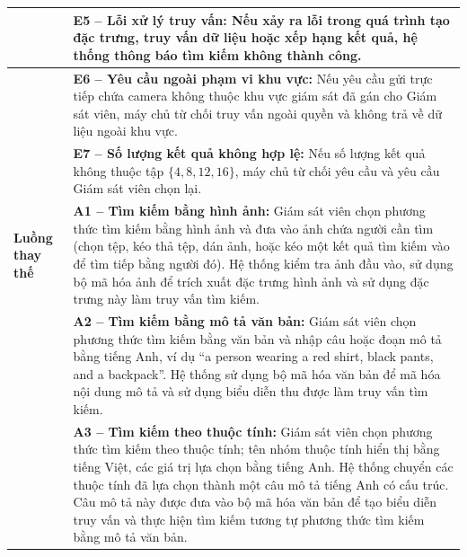 \begin{longtable}{|>{\raggedright\arraybackslash}p{2.9cm}|p{12.3cm}|}
 & \textbf{E5 -- Lỗi xử lý truy vấn:} Nếu xảy ra lỗi trong quá trình tạo đặc trưng, truy vấn dữ liệu hoặc xếp hạng kết quả, hệ thống thông báo tìm kiếm không thành công. \\ \cline{2-2}
 & \textbf{E6 -- Yêu cầu ngoài phạm vi khu vực:} Nếu yêu cầu gửi trực tiếp chứa camera không thuộc khu vực giám sát đã gán cho Giám sát viên, máy chủ từ chối truy vấn ngoài quyền và không trả về dữ liệu ngoài khu vực. \\ \cline{2-2}
 & \textbf{E7 -- Số lượng kết quả không hợp lệ:} Nếu số lượng kết quả không thuộc tập $\{4, 8, 12, 16\}$, máy chủ từ chối yêu cầu và yêu cầu Giám sát viên chọn lại. \\ \hline
\textbf{Luồng thay thế} & \textbf{A1 -- Tìm kiếm bằng hình ảnh:} Giám sát viên chọn phương thức tìm kiếm bằng hình ảnh và đưa vào ảnh chứa người cần tìm (chọn tệp, kéo thả tệp, dán ảnh, hoặc kéo một kết quả tìm kiếm vào để tìm tiếp bằng người đó). Hệ thống kiểm tra ảnh đầu vào, sử dụng bộ mã hóa ảnh để trích xuất đặc trưng hình ảnh và sử dụng đặc trưng này làm truy vấn tìm kiếm. \\ \cline{2-2}
 & \textbf{A2 -- Tìm kiếm bằng mô tả văn bản:} Giám sát viên chọn phương thức tìm kiếm bằng văn bản và nhập câu hoặc đoạn mô tả bằng tiếng Anh, ví dụ “a person wearing a red shirt, black pants, and a backpack”. Hệ thống sử dụng bộ mã hóa văn bản để mã hóa nội dung mô tả và sử dụng biểu diễn thu được làm truy vấn tìm kiếm. \\ \cline{2-2}
 & \textbf{A3 -- Tìm kiếm theo thuộc tính:} Giám sát viên chọn phương thức tìm kiếm theo thuộc tính; tên nhóm thuộc tính hiển thị bằng tiếng Việt, các giá trị lựa chọn bằng tiếng Anh. Hệ thống chuyển các thuộc tính đã lựa chọn thành một câu mô tả tiếng Anh có cấu trúc. Câu mô tả này được đưa vào bộ mã hóa văn bản để tạo biểu diễn truy vấn và thực hiện tìm kiếm tương tự phương thức tìm kiếm bằng mô tả văn bản. \\ \hline
\end{longtable}

